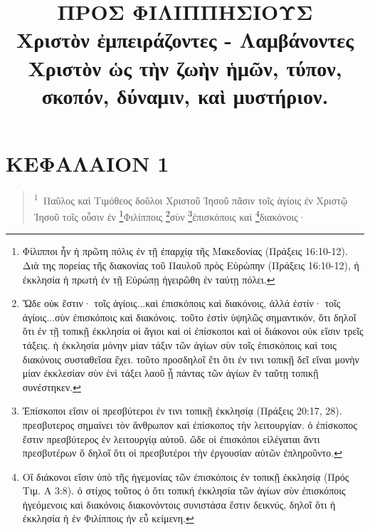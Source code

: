 \documentclass{article}
\newcommand{\currentverse}{1} %
\newcommand{\setcurrentverse}[1]{\renewcommand{\currentverse}{#1}}
\newcounter{versecounter}
\newcommand{\newverse}{%
  \stepcounter{versecounter}%
  \setcounter{footnote}{0}%
}
\renewcommand{\thefootnote}{\textsuperscript{\theversecounter\textsuperscript{\arabic{footnote}}}}
\begin{document}

\newcommand{\versenum}[1]{%
  \newverse%
  \textbf{\textcolor{verseblue}{#1}}
}

\renewcommand{\thefootnote}{\textcolor{footnoteblue}{\arabic{footnote}}}

\title{ΠΡΟΣ ΦΙΛΙΠΠΗΣΙΟΥΣ\\[1ex] \Large Χριστὸν ἐμπειράζοντες - Λαμβάνοντες Χριστὸν ὡς τὴν ζωὴν ἡμῶν, τύπον, σκοπόν, δύναμιν, καὶ μυστήριον.}
\date{}
\maketitle
\section*{ΚΕΦΑΛΑΙΟΝ 1}

\begin{verse}

\setcurrentverse{1}

\setcounter{footnote}{0}

\textsuperscript{1}~Παῦλος καὶ Τιμόθεος δοῦλοι Χριστοῦ Ἰησοῦ πᾶσιν τοῖς ἁγίοις ἐν Χριστῷ Ἰησοῦ τοῖς οὖσιν ἐν \footnote{Φίλιπποι ἦν ἡ πρῶτη πόλις ἐν τῇ ἐπαρχίᾳ τῆς Μακεδονίας (Πράξεις 16:10-12). Διὰ της πορείας τῆς διακονίας τοῦ Παυλοῦ πρὸς Εὐρώπην (Πράξεις 16:10-12), ἡ ἐκκλησία ἡ πρωτή ἐν τῇ Εὐρώπῃ ἠγειρῶθη ἐν ταύτῃ πόλει.}Φιλίπποις \footnote{
    Ὥδε οὐκ ἔστιν· τοῖς ἁγίοις...καὶ ἐπισκόποις καὶ διακόνοις, ἀλλά ἐστίν· τοῖς ἁγίοις...σὺν ἐπισκόποις καὶ διακόνοις. τοῦτο ἐστὶν ὑψηλῶς σημαντικόν, ὅτι δηλοῖ ὅτι ἐν τῇ τοπικῇ ἐκκλησία οἱ ἅγιοι καὶ οἱ ἐπίσκοποι καὶ οἱ διάκονοι οὐκ εἴσιν τρεῖς τάξεις. ἡ ἐκκλησία μόνην μίαν τάξιν τῶν ἁγίων σὺν τοῖς ἐπισκόποις καὶ τοις διακόνοις συσταθεῖσα ἔχει. τοῦτο προσδηλοῖ ἔτι ὅτι ἐν τινι τοπικῇ δεῖ εἴναι μονὴν μίαν ἐκκλεσίαν σὺν ἑνὶ τάξει λαοῦ ᾗ πάντας τῶν ἁγίων ἔν ταῦτῃ τοπικῇ συνέστηκεν.
    }σὺν \footnote{Ἐπίσκοποι εἴσιν οἱ πρεσβύτεροι ἐν τινι τοπικῇ ἐκκλησίᾳ (Πράξεις 20:17, 28). πρεσβυτερος σημαίνει τὸν ἄνθρωπον καὶ ἐπίσκοπος τὴν λειτουργίαν. ὁ ἐπίσκοπος ἔστιν πρεσβύτερος ἐν λειτουργίᾳ αὐτοῦ. ὥδε οἱ ἐπισκόποι εἰλέγαται ἄντι πρεσβυτέρων ὅ δηλοῖ ὅτι οἱ πρεσβυτέροι τὴν ἐργουσίαν αὐτῶν ἐπληροῦντο.}ἐπισκόποις καὶ \footnote{Οἵ διάκονοι εἴσιν ὑπὸ τῆς ἡγεμονίας τῶν ἐπισκόποις ἐν τοπικῇ ἐκκλησίᾳ (Πρός Τιμ. Α 3:8). ὁ στίχος τοῦτος ὁ ὄτι τοπική ἐκκλησία τῶν ἁγίων σὺν ἐπισκόποις ἡγεόμενοις καὶ διακόνοις διακονόντοις συνιστάσα ἔστιν δεικνύς, δηλοῖ ὅτι ἡ ἐκκλησία ἡ ἐν Φιλίπποις ἠν εὖ κείμενη.}διακόνοις·

\end{verse}
\end{document}
